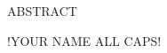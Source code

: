 {}

\begin{center}
    \large
    ABSTRACT
    
    \large
    \dissertationTitle{}
    
    \large
    \vspace{2mm}
    !YOUR NAME ALL CAPS!
    
\end{center} 

\noindent \lipsum[1-2]